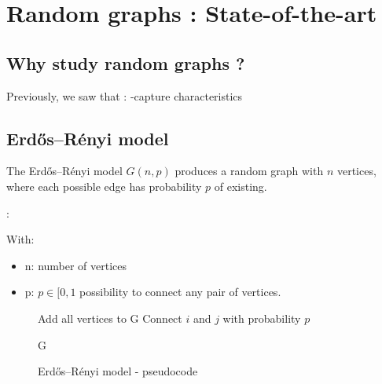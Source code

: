 \documentclass[table]{report}
\begin{document}
\section{Random graphs : State-of-the-art}


%

\subsection{Why study random graphs ?}

Previously, we saw that :
-capture characteristics

\subsection{Erdős–Rényi model}

The Erdős–Rényi model $G(n,p)$ produces a random graph with $n$ vertices, where each possible edge has probability $p$ of existing.



:

\noindent
With:
\begin{itemize}[noitemsep]
\item n: number of vertices
\item p: $p \in [0,1$ possibility to connect any pair of vertices.
\end{itemize}



\begin{figure}[htb]
\centering
\begin{minipage}{.7\columnwidth}
\begin{algorithm}[H]
\SetAlgoLined
{}

 \BlankLine
 Add all vertices to G \newline 
 {
 	Connect $i$ and $j$ with probability $p$
 }
 
 \Return G
\caption{Erdős–Rényi model - pseudocode}
\end{algorithm}
\end{minipage}
\end{figure}
\end{document}
